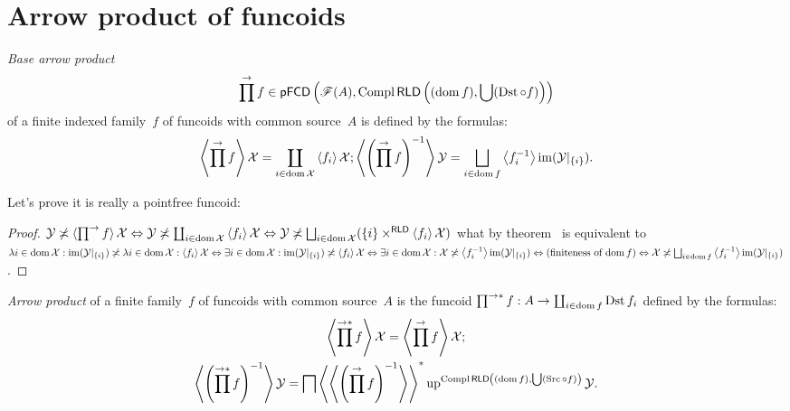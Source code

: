 \section{Arrow product of funcoids}

\begin{defn}
\emph{Base arrow product} \[ \prod^{\rightarrow}f\in\mathsf{pFCD}\left(\mathscr{F}(A),\operatorname{Compl}\mathsf{RLD}\left((\operatorname{dom} f),\bigcup(\operatorname{Dst}\circ f)\right)\right) \] of a finite indexed family~$f$ of funcoids with common source~$A$ is defined by the formulas:
\[
\supfun{\prod^{\rightarrow} f}\mathcal{X} = \coprod_{i\in\dom\mathcal{X}}\supfun{f_i}\mathcal{X};
\supfun{\left(\prod^{\rightarrow} f\right)^{-1}}\mathcal{Y} = \bigsqcup_{i\in\dom f}\supfun{f_i^{-1}}\im(\mathcal{Y}|_{\{i\}}).
\]
\end{defn}

Let's prove it is really a pointfree funcoid:

\begin{proof}
$\mathcal{Y}\nasymp\supfun{\prod^{\rightarrow} f}\mathcal{X}
\Leftrightarrow
\mathcal{Y}\nasymp\coprod_{i\in\dom\mathcal{X}}\supfun{f_i}\mathcal{X}
\Leftrightarrow
\mathcal{Y}\nasymp\bigsqcup_{i\in\dom\mathcal{X}}(\{i\}\times^{\mathsf{RLD}}\supfun{f_i}\mathcal{X})$
what by theorem~ is equivalent to
$\lambda i\in\dom\mathcal{X}:\im(\mathcal{Y}|_{\{i\}})\nasymp
\lambda i\in\dom\mathcal{X}:\supfun{f_i}\mathcal{X}
\Leftrightarrow
\exists i\in\dom\mathcal{X}:\im(\mathcal{Y}|_{\{i\}})\nasymp
\supfun{f_i}\mathcal{X}
\Leftrightarrow
\exists i\in\dom\mathcal{X}:\mathcal{X}\nasymp\supfun{f_i^{-1}}\im(\mathcal{Y}|_{\{i\}})
\Leftrightarrow\text{(finiteness of $\dom f$)}\Leftrightarrow
\mathcal{X}\nasymp\bigsqcup_{i\in\dom f}\supfun{f_i^{-1}}\im(\mathcal{Y}|_{\{i\}})$.
\end{proof}

\begin{defn}
\emph{Arrow product} of a finite family~$f$ of funcoids with common source~$A$ is the funcoid $\prod^{\rightarrow\ast}f:A\to\coprod_{i\in\operatorname{dom} f}\operatorname{Dst} f_i$ defined by the formulas:
\begin{gather*}
\left\langle \prod^{\rightarrow\ast}f\right\rangle\mathcal{X} =
\left\langle \prod^{\rightarrow}f\right\rangle\mathcal{X};\\
\left\langle \left(\prod^{\rightarrow\ast} f\right)^{-1}\right\rangle\mathcal{Y} =
\bigsqcap\left\langle \left\langle \left(\prod^{\rightarrow}f\right)^{-1}\right\rangle\right\rangle ^{\ast}\operatorname{up}^{\operatorname{Compl}\mathsf{RLD}\left((\operatorname{dom} f),\bigcup(\operatorname{Src}\circ f)\right)}\mathcal{Y}.
\end{gather*}
\end{defn}

